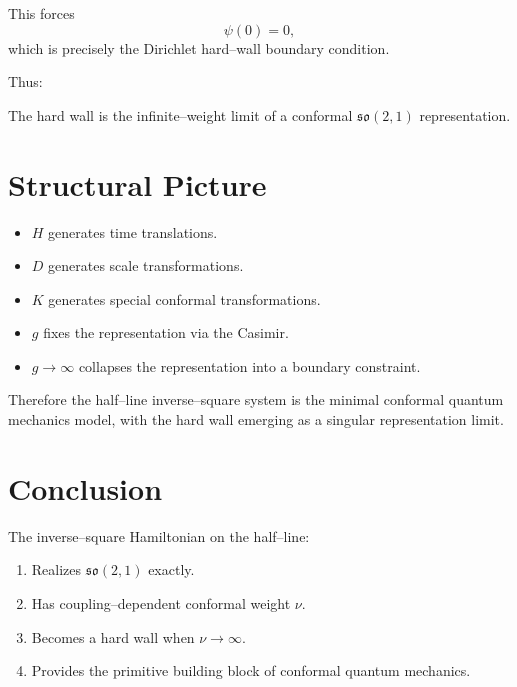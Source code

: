 \documentclass[11pt,a4paper]{article}
\begin{document}
This forces
\begin{equation}
\psi(0)=0,
\end{equation}
which is precisely the Dirichlet hard–wall boundary condition.

Thus:

\begin{center}
The hard wall is the infinite–weight limit
of a conformal $\mathfrak{so}(2,1)$ representation.
\end{center}

\section{Structural Picture}

\begin{itemize}
\item $H$ generates time translations.
\item $D$ generates scale transformations.
\item $K$ generates special conformal transformations.
\item $g$ fixes the representation via the Casimir.
\item $g\to\infty$ collapses the representation into
a boundary constraint.
\end{itemize}

Therefore the half–line inverse–square system
is the minimal conformal quantum mechanics model,
with the hard wall emerging as a singular representation limit.

\section{Conclusion}

The inverse–square Hamiltonian on the half–line:

\begin{enumerate}
\item Realizes $\mathfrak{so}(2,1)$ exactly.
\item Has coupling–dependent conformal weight $\nu$.
\item Becomes a hard wall when $\nu\to\infty$.
\item Provides the primitive building block of
conformal quantum mechanics.
\end{enumerate}
\end{document}
